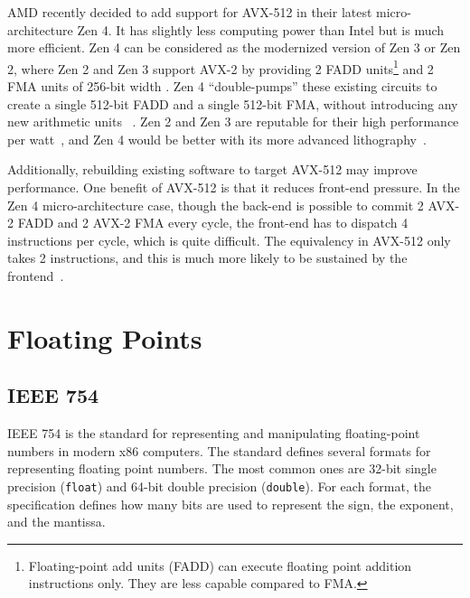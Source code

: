 \documentclass[logo,bsc,singlespacing,parskip]{infthesis}
\newcommand{\dtfloat}{\texttt{float}}
\newcommand{\dtdouble}{\texttt{double}}
\begin{document}
AMD recently decided to add support for AVX-512 in their latest
micro-architecture Zen 4. It has slightly less computing power than
Intel but is much more efficient. Zen 4 can be considered as the modernized version of
Zen 3 or Zen 2, where Zen 2 and Zen 3 support AVX-2  by providing 2 FADD
units\footnote{Floating-point add units (FADD) can execute floating point addition
 instructions only. They are less capable compared to FMA.} and 2 FMA units of
256-bit width \cite{Zen2ChipWiki}. Zen 4 ``double-pumps'' these existing circuits
to create a single 512-bit FADD and a single 512-bit FMA, without introducing
any new arithmetic units ~\cite{Zen4Critique}. Zen 2 and Zen 3 are reputable for
their high performance per watt~\cite{ZenPerfPerWatt}, and Zen 4 would be better
with its more advanced lithography~\cite{Zen4Critique}.

Additionally, rebuilding existing software to target AVX-512 may
improve performance. One benefit of AVX-512 is that it reduces
front-end pressure. In the Zen 4 micro-architecture case, though the back-end is
possible to commit 2 AVX-2 FADD and 2 AVX-2 FMA every cycle,
the front-end has to dispatch 4 instructions per cycle, which is quite
difficult. The equivalency in AVX-512 only takes 2 instructions, and
this is much more likely to be sustained by the frontend~\cite{Zen4Critique}.


\section{Floating Points}
\label{sec:i23}
\subsection{IEEE 754}
\label{sec:IEEE754}
IEEE 754 is the standard for representing and manipulating floating-point
numbers in modern x86 computers. The standard defines several formats
for representing floating point numbers. The most common ones are 32-bit single
precision (\dtfloat{}) and 64-bit double precision (\dtdouble{}). For each format, the 
specification
defines how many bits are used to represent the sign, the exponent, and the mantissa. 
\end{document}
